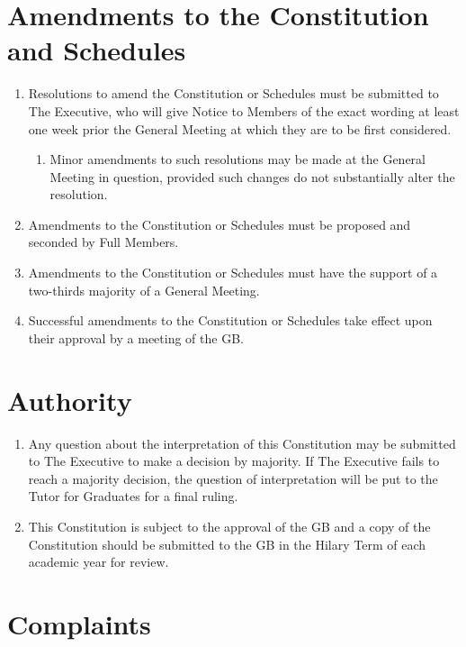 \documentclass[11pt, a4paper]{article}
\begin{document}
\section{Amendments to the Constitution and Schedules}
\label{sec:amendment}

\begin{enumerate}
	\item Resolutions to amend the Constitution or Schedules must be submitted to The Executive, who will give Notice to Members of the exact wording at least one week prior the General Meeting at which they are to be first considered.
	\begin{enumerate}
	    \item Minor amendments to such resolutions may be made at the General Meeting in question, provided such changes do not substantially alter the resolution.
	\end{enumerate}
    \item Amendments to the Constitution or Schedules must be proposed and seconded by Full Members.
    \item Amendments to the Constitution or Schedules must have the support of a two-thirds majority of a General Meeting.
    \item Successful amendments to the Constitution or Schedules take effect upon their approval by a meeting of the GB.
\end{enumerate}





\section{Authority}
\label{sec:authority}

\begin{enumerate}
	\item Any question about the interpretation of this Constitution may be submitted to The Executive to make a decision by majority. If The Executive fails to reach a majority decision, the question of interpretation will be put to the Tutor for Graduates for a final ruling.
    \item This Constitution is subject to the approval of the GB and a copy of the Constitution should be submitted to the GB in the Hilary Term of each academic year for review.
\end{enumerate}





\section{Complaints}
\label{sec:complaints}
\end{document}
